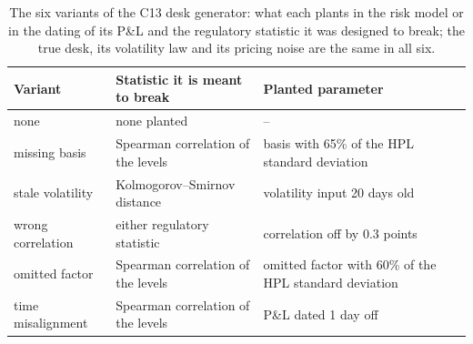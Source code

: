 \begin{table}[htbp]
\centering
\footnotesize
\caption{The six variants of the C13 desk generator: what each plants in the risk model or in the dating of its P\&L and the regulatory statistic it was designed to break; the true desk, its volatility law and its pricing noise are the same in all six.}
\label{tab:variants}
\begin{tabular}{>{\raggedright\arraybackslash}p{2.4cm}>{\raggedright\arraybackslash}p{4.0cm}>{\raggedright\arraybackslash}p{7.4cm}}
\toprule
Variant & Statistic it is meant to break & Planted parameter \\
\midrule
none & none planted & -- \\
missing basis & Spearman correlation of the levels & \relax basis with 65\% of the HPL standard deviation \\
stale volatility & Kolmogorov--Smirnov distance & volatility input 20 days old \\
wrong correlation & either regulatory statistic & correlation off by 0.3 points \\
omitted factor & Spearman correlation of the levels & \relax omitted factor with 60\% of the HPL standard deviation \\
time misalignment & Spearman correlation of the levels & \relax P\&L dated 1 day off \\
\bottomrule
\end{tabular}
\end{table}
